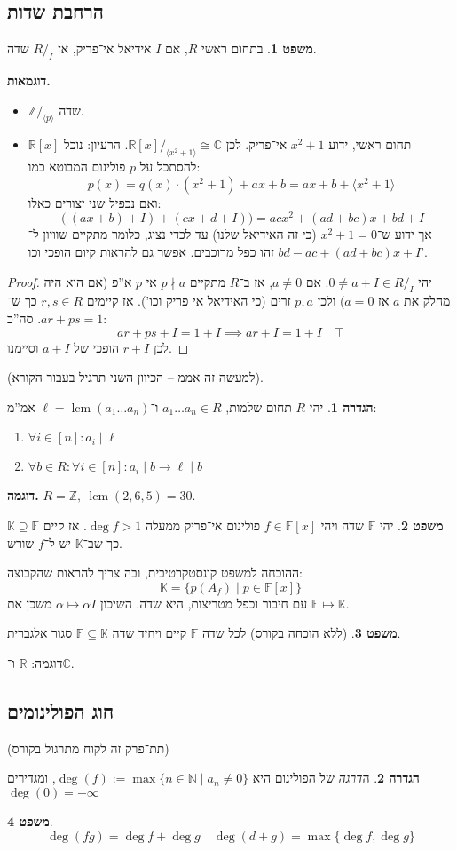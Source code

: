 \documentclass[a4paper]{article}
\newcommand\N     {\mathbb{N}}
\newcommand\Z     {\mathbb{Z}}
\newcommand\R     {\mathbb{R}}
\newcommand\C     {\mathbb{C}}
\newcommand\K     {\mathbb{K}}
\newcommand\ml    {\ell}
\newcommand\so    {\longrightarrow}
\newcommand\ra    {\rangle}
\newcommand\la    {\langle}
\renewcommand\inf {\infty}
\DeclareMathOperator{\lcm}     {lcm}
\newcommand\F         {\mathbb{F}}
\newcommand\co        {\colon}
\newcommand\ag        {\alpha}
\theoremstyle{definition}
\newtheorem{Theorem}{משפט}
\newtheorem{definition}{הגדרה}
\newcommand\theo  [1] {\begin{Theorem}#1\end{Theorem}}
\newcommand\defi  [1] {\begin{definition}#1\end{definition}}
\begin{document}
	\subsection{הרחבת שדות}
	\theo{בתחום ראשי $R$, אם $I$ אידיאל אי־פריק, אז $R/_I$ שדה. }
	
	\textbf{דוגמאות. }
	\begin{itemize}
		\item $\Z/_{\la p \ra}$ שדה. 
		\item $\R[x]$ תחום ראשי, ידוע $x^2 + 1$ אי־פריק. לכן $\R[x]/_{\la x^2 + 1\ra}\cong \C$. הרעיון: נוכל להסתכל על $p$ פולינום המבוטא כמו: 
		\[ p(x) = q(x) \cdot (x^2 + 1) + ax + b = ax +b + \la x^2 + 1\ra \]
		ואם נכפיל שני יצורים כאלו: 
		\[ ((ax + b) + I) + (cx + d + I)) = acx^2 + (ad + bc)x + bd + I \]
		אך ידוע ש־$x^2 + 1 = 0$ (כי זה האידיאל שלנו) עד לכדי נציג, כלומר מתקיים שוויון ל־$bd - ac + (ad + bc)x + I$ זהו כפל מרוכבים. אפשר גם להראות קיום הופכי וכו'. 
	\end{itemize}
	\begin{proof}
		יהי $0 \neq a + I \in R/_I$. אם $a \neq 0$, אז ב־$R$ מתקיים $p \nmid a$ אי $p$ א''פ (אם הוא היה מחלק את $a$ אז $a = 0$) ולכן $p, a$ זרים (כי האידיאל אי פריק וכו'). אז קיימים $r, s \in R$ כך ש־$ar + ps = 1$. סה''כ: 
		\[ ar + ps + I = 1 + I \implies ar + I = 1 + I \quad \top \]
		לכן $r + I$ הופכי של $a + I$ וסיימנו. 
	\end{proof}
	(למעשה זה אממ – הכיוון השני תרגיל בעבור הקורא). 
	
	\defi{יהי $R$ תחום שלמות, $a_1 \dots a_n \in R$ ו־$\ml = \lcm(a_1 \dots a_n)$ אמ''מ: 
		\begin{enumerate}
			\item \hfil $\forall i \in [n] \co a_i \mid \ml$
			\item \hfil $\forall b \in R \co \forall i \in [n] \co a_i \mid b \so \ml \mid b$
	\end{enumerate}}
	\textbf{דוגמה. }$R = \Z, \ \lcm(2, 6, 5) = 30$. 
	
	\theo{יהי $\F$ שדה ויהי $f \in \F[x]$ פולינום אי־פריק ממעלה $\deg f > 1$. אז קיים $\K \supseteq \F$ כך שב־$\K$ יש ל־$f$ שורש. }
	ההוכחה למשפט קונסטקרטיבית, ובה צריך להראות שהקבוצה: 
	\[ \K = \{p(A_f) \mid p \in \F[x]\} \]
	עם חיבור וכפל מטריצות, היא שדה. השיכון $\ag \mapsto \ag I$ משכן את $\F \mapsto \K$. 
	
	
	\theo{(ללא הוכחה בקורס) לכל שדה $\F$ קיים ויחיד שדה $\F \subseteq \K$ סגור אלגברית. }
	דוגמה: $\R$ ו־$\C$. 
	
	\subsection{חוג הפולינומים}
	(תת־פרק זה לקוח מתרגול בקורס)
	\defi{ה\textit{דרגה} של הפולינום היא $\deg(f) := \max\{n \in \N \mid a_n \neq 0\}$, ומגדירים $\deg(0) = -\inf$}
	\theo{
	\[ \deg(fg) = \deg f + \deg g \quad \deg(d + g) = \max\{\deg f, \deg g\} \]}
	
\end{document}
